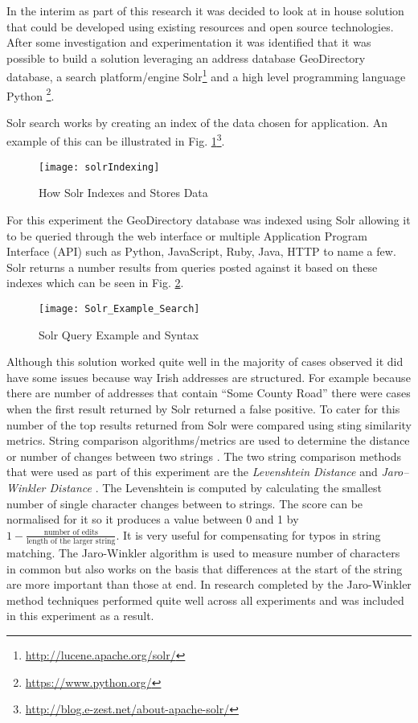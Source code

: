In the interim as part of this research it was decided to look at in house solution that could be developed using existing resources and open source technologies. After some investigation and experimentation it was identified that it was possible to build a solution leveraging an address database GeoDirectory database, a search platform/engine Solr\footnote{\url{http://lucene.apache.org/solr/}} and a high level programming language Python \footnote{\url{https://www.python.org/}}.


Solr search works by creating an index of the data chosen for application. An example of this can be illustrated in Fig. \ref{fig:solrIndexing}\footnote{\url{http://blog.e-zest.net/about-apache-solr/}}. 

\begin{figure}[H]
	\texttt{[image: solrIndexing]}
	\caption[Illustration of Inverted Indexing]
	{How Solr Indexes and Stores Data}
	\label{fig:solrIndexing}
\end{figure}

For this experiment the GeoDirectory database was indexed using Solr allowing it to be queried through the web interface or multiple Application Program Interface (API) such as Python, JavaScript, Ruby, Java, HTTP to name a few. Solr returns a number results from queries posted against it based on these indexes which can be seen in Fig. \ref{fig:Solr_Example_Search from Web Interface}.

\begin{figure}[H]
	\texttt{[image: Solr\_Example\_Search]}
	\caption{Solr Query Example and Syntax}
	\label{fig:Solr_Example_Search from Web Interface}
\end{figure}

Although this solution worked quite well in the majority of cases observed it did have some issues because way Irish addresses are structured. For example because there are number of addresses that contain ``Some County Road'' there were cases when the first result returned by Solr returned a false positive. To cater for this number of the top results returned from Solr were compared using sting similarity metrics. String comparison algorithms/metrics are used to determine the distance or number of changes between two strings \citep{wagner_string--string_1974}. The two string comparison methods that were used as part of this experiment are the \textit{Levenshtein Distance} \citep{levenshtein_binary_1966} and \textit{Jaro–Winkler Distance} \citep{winkler_string_1990}. The Levenshtein is computed by calculating the smallest number of single character changes between to strings. The score can be normalised for it so it produces a value between 0 and 1 by $1 -\frac{\text{number of edits}}{\text{length of the larger string}}$. It is very useful for compensating for typos in string matching. The Jaro-Winkler algorithm is used to measure number of characters in common but also works on the basis that differences at the start of the string are more important than those at end. In research completed by \cite{christen_comparison_2006} the Jaro-Winkler method techniques performed quite well across all experiments and was included in this experiment as a result. 

